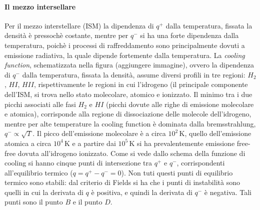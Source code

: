 \paragraph{Il mezzo intersellare}
Per il mezzo interstellare (ISM) la dipendenza di $q^+$ dalla temperatura, fissata la densità è pressochè costante, mentre per $q^-$ si ha una forte dipendenza dalla temperatura, poichè i processi di raffreddamento sono principalmente dovuti a emissione radiativa, la quale dipende fortemente dalla temperatura. La \textit{cooling function}, schematizzata nella figura (aggiungere immagine), ovvero la dipendenza di $q^-$ dalla temperatura, fissata la densità, assume diversi profili in tre regioni: $H_2$, $HI$, $HII$, rispettivamente le regioni in cui l'idrogeno (il principale componente dell'ISM, si trova nello stato molecolare, atomico e ionizzato. Il minimo tra i due picchi associati alle fasi $H_2$ e $HI$ (picchi dovute alle righe di emissione molecolare e atomica), corrisponde alla regione di dissociazione delle molecole dell'idrogeno, mentre per alte temperature la cooling function è dominata dalla bremsstrahlung, $q^-\propto\sqrt{T}$. Il picco dell'emissione molecolare è a circa $10^2\, \mathrm{K}$, quello dell'emissione atomica a circa $10^4\, \mathrm{K}$ e a partire dai $10^5\, \mathrm{K}$ si ha prevalentemente emissione free-free dovuta all'idrogeno ionizzato. Come si vede dallo schema della funzione di cooling si hanno cinque punti di intersezione tra $q^+$ e $q^-$, corrispondenti all'equilibrio termico ($q=q^+-q^-=0$). Non tuti questi punti di equilibrio termico sono stabili: dal criterio di Fields si ha che i punti di instabilità sono quelli in cui la derivata di $q$ è positiva, e quindi la derivata di $q^-$ è negativa. Tali punti sono il punto $B$ e il punto $D$.

